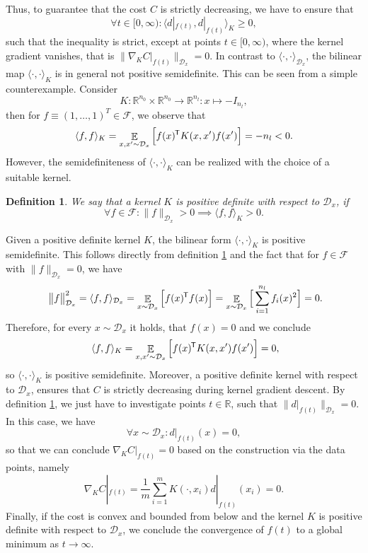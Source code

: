 \documentclass[11pt, a4paper]{article}
\newtheorem{definition}[theorem]{Definition}
\newcommand{\R}{\mathbb{R}}
\newcommand{\D}{\mathcal{D}}
\newcommand{\F}{\mathcal{F}}
\newcommand*{\tr}{^{\mkern-1.5mu\mathsf{T}}}
\DeclareMathOperator*{\E}{\mathbb{E}}
\begin{document}
Thus, to guarantee that the cost $C$ is strictly decreasing, we have to ensure that
\[ \forall t \in [0,\infty) : \big \langle d|_{f(t)}, d|_{f(t)} \big \rangle_{K} \geq 0, \]
such that the inequality is strict, except at points $t \in [0,\infty)$, where the kernel gradient vanishes, that is $\big \| \nabla_KC|_{f(t)} \big \|_{\D_x} = 0$. In contrast to $\langle \cdot , \cdot \rangle_{\D_x}$, the bilinear map $\langle \cdot , \cdot \rangle_{K}$ is in general not positive semidefinite. This can be seen from a simple counterexample. Consider
\[ K: \R^{n_0} \times \R^{n_0} \to \R^{n_l} : x \mapsto - I_{n_l}, \]
then for $f \equiv (1, \dots, 1)^T \in \F$, we observe that
\[ \langle f , f \rangle_{K} = \E_{x,x' \sim \D_x} \Big [ f(x)\tr K(x,x')f(x') \Big ] = -n_l < 0. \]
However, the semidefiniteness of $\langle \cdot , \cdot \rangle_{K}$ can be realized with the choice of a suitable kernel.

\begin{definition} \label{def:definite}
We say that a kernel $K$ is positive definite with respect to $\D_x$, if 
\[ \forall f \in \F: \| f \|_{\D_x} > 0 \implies \langle f,f \rangle_K > 0. \]
\end{definition}

Given a positive definite kernel $K$, the bilinear form $\langle \cdot , \cdot \rangle_{K}$ is positive semidefinite. This follows directly from definition \ref{def:definite} and the fact that for $f \in \F$ with $\| f \|_{\D_x} = 0$, we have
\[ \big \| f \big \|_{\D_x}^2 = \langle f, f \rangle_{\D_x} = \E_{x \sim \D_x} \Big [ f(x) \tr f(x) \Big ] = \E_{x \sim \D_x} \Big [ \sum_{i=1}^{n_l}f_i(x)^2 \Big ] = 0. \]
Therefore, for every $x \sim \D_x$ it holds, that $f(x)=0$ and we conclude
\[ \langle f,f \rangle_K = \E_{x,x' \sim \D_x} \Big [ f(x) \tr K(x,x') f(x') \Big ] = 0, \]
so $\langle \cdot, \cdot \rangle_K$ is positive semidefinite. Moreover, a positive definite kernel with respect to $\D_x$, ensures that $C$ is strictly decreasing during kernel gradient descent. By definition \ref{def:definite}, we just have to investigate points $t \in \R$, such that $\big \| d|_{f(t)} \big \|_{\D_x} = 0$. In this case, we have
\[ \forall x \sim \D_x : d|_{f(t)}(x) = 0, \]
so that we can conclude $\nabla_K C|_{f(t)} = 0$ based on the construction via the data points, namely
\[ \nabla_KC|_{f(t)} = \frac{1}{m} \sum_{i=1}^{m} K(\cdot,x_i)d|_{f(t)}(x_i) = 0.\]
Finally, if the cost is convex and bounded from below and the kernel $K$ is positive definite with respect to $\D_x$, we conclude the convergence of $f(t)$ to a global minimum as $t \to \infty$. \\
\end{document}
